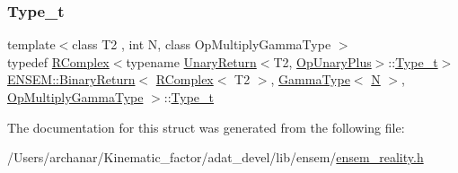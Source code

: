 \subsubsection{\texorpdfstring{Type\_t}{Type\_t}\hspace{0.1cm}{\footnotesize\ttfamily [2/2]}}
{\footnotesize\ttfamily template$<$class T2 , int N, class Op\+Multiply\+Gamma\+Type $>$ \\
typedef \mbox{\hyperlink{classENSEM_1_1RComplex}{R\+Complex}}$<$typename \mbox{\hyperlink{structENSEM_1_1UnaryReturn}{Unary\+Return}}$<$T2, \mbox{\hyperlink{structENSEM_1_1OpUnaryPlus}{Op\+Unary\+Plus}}$>$\+::\mbox{\hyperlink{structENSEM_1_1BinaryReturn_3_01RComplex_3_01T2_01_4_00_01GammaType_3_01N_01_4_00_01OpMultiplyGammaType_01_4_a259c20af5404705bcd958ee95cec920a}{Type\+\_\+t}}$>$ \mbox{\hyperlink{structENSEM_1_1BinaryReturn}{E\+N\+S\+E\+M\+::\+Binary\+Return}}$<$ \mbox{\hyperlink{classENSEM_1_1RComplex}{R\+Complex}}$<$ T2 $>$, \mbox{\hyperlink{classENSEM_1_1GammaType}{Gamma\+Type}}$<$ \mbox{\hyperlink{operator__name__util_8cc_a7722c8ecbb62d99aee7ce68b1752f337}{N}} $>$, \mbox{\hyperlink{structENSEM_1_1OpMultiplyGammaType}{Op\+Multiply\+Gamma\+Type}} $>$\+::\mbox{\hyperlink{structENSEM_1_1BinaryReturn_3_01RComplex_3_01T2_01_4_00_01GammaType_3_01N_01_4_00_01OpMultiplyGammaType_01_4_a259c20af5404705bcd958ee95cec920a}{Type\+\_\+t}}}



The documentation for this struct was generated from the following file\+:\begin{DoxyCompactItemize}
\item 
/\+Users/archanar/\+Kinematic\+\_\+factor/adat\+\_\+devel/lib/ensem/\mbox{\hyperlink{lib_2ensem_2ensem__reality_8h}{ensem\+\_\+reality.\+h}}\end{DoxyCompactItemize}
